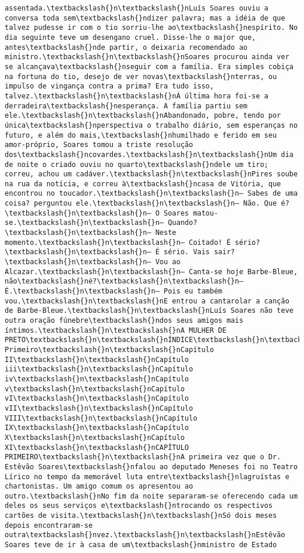 \documentclass[11pt]{article}
\begin{document}
\begin{Verbatim}[commandchars=\\\{\}]
assentada.\textbackslash{}n\textbackslash{}nLuís Soares ouviu a conversa toda sem\textbackslash{}ndizer palavra; mas a idéia de que talvez pudesse ir com o tio sorriu-lhe ao\textbackslash{}nespírito. No dia seguinte teve um desengano cruel. Disse-lhe o major que, antes\textbackslash{}nde partir, o deixaria recomendado ao ministro.\textbackslash{}n\textbackslash{}nSoares procurou ainda ver se alcançava\textbackslash{}nseguir com a família. Era simples cobiça na fortuna do tio, desejo de ver novas\textbackslash{}nterras, ou impulso de vingança contra a prima? Era tudo isso, talvez.\textbackslash{}n\textbackslash{}nÀ última hora foi-se a derradeira\textbackslash{}nesperança. A família partiu sem ele.\textbackslash{}n\textbackslash{}nAbandonado, pobre, tendo por única\textbackslash{}nperspectiva o trabalho diário, sem esperanças no futuro, e além do mais,\textbackslash{}nhumilhado e ferido em seu amor-próprio, Soares tomou a triste resolução dos\textbackslash{}ncovardes.\textbackslash{}n\textbackslash{}nUm dia de noite o criado ouviu no quarto\textbackslash{}ndele um tiro; correu, achou um cadáver.\textbackslash{}n\textbackslash{}nPires soube na rua da notícia, e correu à\textbackslash{}ncasa de Vitória, que encontrou no toucador.\textbackslash{}n\textbackslash{}n— Sabes de uma coisa? perguntou ele.\textbackslash{}n\textbackslash{}n— Não. Que é?\textbackslash{}n\textbackslash{}n— O Soares matou-se.\textbackslash{}n\textbackslash{}n— Quando?\textbackslash{}n\textbackslash{}n— Neste momento.\textbackslash{}n\textbackslash{}n— Coitado! É sério?\textbackslash{}n\textbackslash{}n— É sério. Vais sair?\textbackslash{}n\textbackslash{}n— Vou ao Alcazar.\textbackslash{}n\textbackslash{}n— Canta-se hoje Barbe-Bleue, não\textbackslash{}né?\textbackslash{}n\textbackslash{}n— É.\textbackslash{}n\textbackslash{}n— Pois eu também vou.\textbackslash{}n\textbackslash{}nE entrou a cantarolar a canção de Barbe-Bleue.\textbackslash{}n\textbackslash{}nLuís Soares não teve outra oração fúnebre\textbackslash{}ndos seus amigos mais íntimos.\textbackslash{}n\textbackslash{}nA MULHER DE PRETO\textbackslash{}n\textbackslash{}nÍNDICE\textbackslash{}n\textbackslash{}nCapítulo Primeiro\textbackslash{}n\textbackslash{}nCapítulo II\textbackslash{}n\textbackslash{}nCapítulo iii\textbackslash{}n\textbackslash{}nCapítulo iv\textbackslash{}n\textbackslash{}nCapítulo v\textbackslash{}n\textbackslash{}nCapítulo vI\textbackslash{}n\textbackslash{}nCapítulo vII\textbackslash{}n\textbackslash{}nCapítulo VIII\textbackslash{}n\textbackslash{}nCapítulo IX\textbackslash{}n\textbackslash{}nCapítulo X\textbackslash{}n\textbackslash{}nCapítulo XI\textbackslash{}n\textbackslash{}nCAPÍTULO PRIMEIRO\textbackslash{}n\textbackslash{}nA primeira vez que o Dr. Estêvão Soares\textbackslash{}nfalou ao deputado Meneses foi no Teatro Lírico no tempo da memorável luta entre\textbackslash{}nlagruístas e chartonistas. Um amigo comum os apresentou ao outro.\textbackslash{}nNo fim da noite separaram-se oferecendo cada um deles os seus serviços e\textbackslash{}ntrocando os respectivos cartões de visita.\textbackslash{}n\textbackslash{}nSó dois meses depois encontraram-se outra\textbackslash{}nvez.\textbackslash{}n\textbackslash{}nEstêvão Soares teve de ir à casa de um\textbackslash{}nministro de Estado 
\end{Verbatim}
\end{document}

